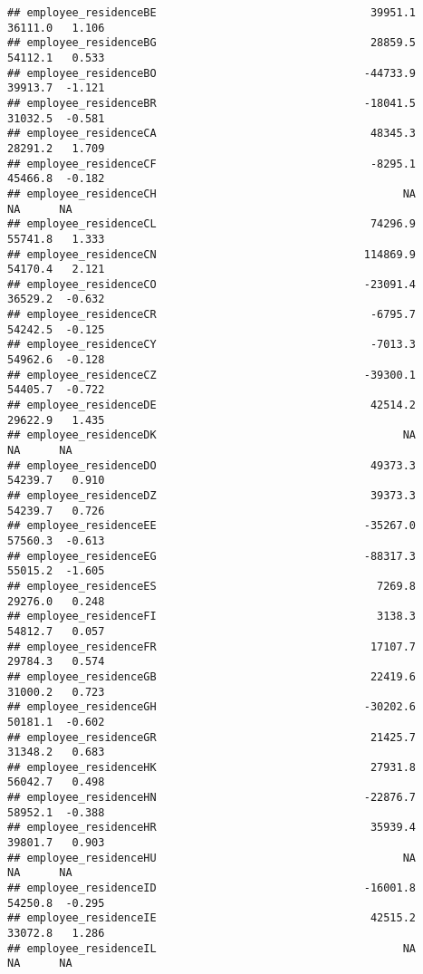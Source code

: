 \documentclass[
]{article}
\begin{document}
\begin{verbatim}
## employee_residenceBE                                 39951.1    36111.0   1.106
## employee_residenceBG                                 28859.5    54112.1   0.533
## employee_residenceBO                                -44733.9    39913.7  -1.121
## employee_residenceBR                                -18041.5    31032.5  -0.581
## employee_residenceCA                                 48345.3    28291.2   1.709
## employee_residenceCF                                 -8295.1    45466.8  -0.182
## employee_residenceCH                                      NA         NA      NA
## employee_residenceCL                                 74296.9    55741.8   1.333
## employee_residenceCN                                114869.9    54170.4   2.121
## employee_residenceCO                                -23091.4    36529.2  -0.632
## employee_residenceCR                                 -6795.7    54242.5  -0.125
## employee_residenceCY                                 -7013.3    54962.6  -0.128
## employee_residenceCZ                                -39300.1    54405.7  -0.722
## employee_residenceDE                                 42514.2    29622.9   1.435
## employee_residenceDK                                      NA         NA      NA
## employee_residenceDO                                 49373.3    54239.7   0.910
## employee_residenceDZ                                 39373.3    54239.7   0.726
## employee_residenceEE                                -35267.0    57560.3  -0.613
## employee_residenceEG                                -88317.3    55015.2  -1.605
## employee_residenceES                                  7269.8    29276.0   0.248
## employee_residenceFI                                  3138.3    54812.7   0.057
## employee_residenceFR                                 17107.7    29784.3   0.574
## employee_residenceGB                                 22419.6    31000.2   0.723
## employee_residenceGH                                -30202.6    50181.1  -0.602
## employee_residenceGR                                 21425.7    31348.2   0.683
## employee_residenceHK                                 27931.8    56042.7   0.498
## employee_residenceHN                                -22876.7    58952.1  -0.388
## employee_residenceHR                                 35939.4    39801.7   0.903
## employee_residenceHU                                      NA         NA      NA
## employee_residenceID                                -16001.8    54250.8  -0.295
## employee_residenceIE                                 42515.2    33072.8   1.286
## employee_residenceIL                                      NA         NA      NA

\end{verbatim}
\end{document}
